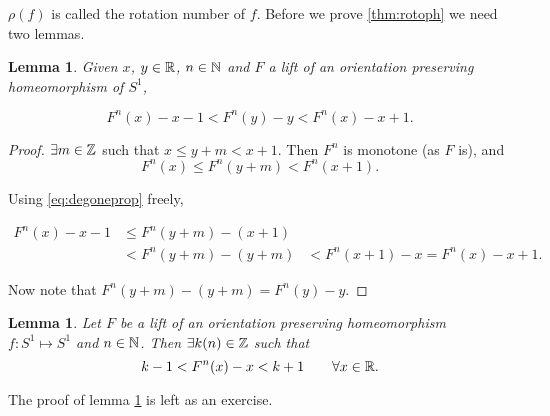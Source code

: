 \documentclass{notes}
\theoremstyle{plain}
\newtheorem{lemma}[proposition]{Lemma}
\begin{document}
$\rho(f)$ is called the rotation number of $f$.  Before we prove
\ref{thm:rotoph} we need two lemmas.

\begin{lemma}\label{lem:rotineq1}
Given $x$, $y \in \mathbb{R}$, $n \in \mathbb{N}$ and $F$ a lift of an orientation
preserving homeomorphism of $S^1$,

\[
F^n(x) - x - 1 < F^n(y) - y < F^n(x) - x + 1.
\]
\end{lemma}

\begin{proof}
$\exists m \in \mathbb{Z}$ such that $x \le y+m < x + 1$.  Then $F^n$ is monotone
(as $F$ is), and
\[
F^n(x) \le F^n(y+m) < F^n(x+1).
\]

Using \eqref{eq:degoneprop} freely,

\begin{align*}
F^n(x) - x - 1 &\le F^n(y+m) - (x+1) \\
& < F^n(y+m) - (y+m)
& < F^n(x+1) - x = F^n(x) -x + 1.
\end{align*}

Now note that $F^n(y+m) - (y+m) = F^n(y) - y$.
\end{proof}

\begin{lemma}\label{lem:rotineq2}
Let $F$ be a lift of an orientation preserving homeomorphism
$f \colon S^1 \mapsto S^1$ and $n \in \mathbb{N}$.  Then
$\exists k(n) \in \mathbb{Z}$ such that
\[
k - 1 < F^n(x) - x < k+1 \qquad \forall x \in \mathbb{R}.
\]
\end{lemma}

The proof of lemma \ref{lem:rotineq2} is left as an exercise.
\end{document}

